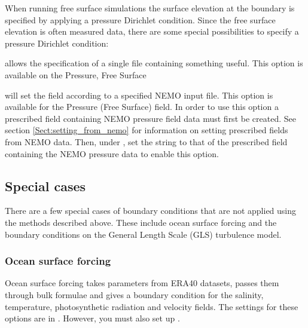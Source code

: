 When running free surface simulations the surface elevation at the boundary is specified by applying a pressure Dirichlet condition. Since the free surface elevation is often measured data, there are some special possibilities to specify a pressure Dirichlet condition: 

 allows the specification of a single file
containing something useful. This option is available on the Pressure, Free
Surface

 will set the field according to a specified NEMO
input file. This option is available for the Pressure (Free Surface) field.
In order to use this option a prescribed field containing NEMO pressure
field data must first be created. See section \ref{Sect:setting_from_nemo}
for information on setting prescribed fields from NEMO data. Then, under
, set the string to that of the prescribed
field containing the NEMO pressure data to enable this option.


\subsection{Special cases}\label{Sect:BCs:special}

There are a few special cases of boundary conditions that are not applied
using the methods described above.  These include ocean surface forcing and
the boundary conditions on the General Length Scale (GLS) turbulence model.

\subsubsection{Ocean surface forcing}\label{Sect:BCs:special:oceans}

Ocean surface forcing takes parameters from ERA40 datasets, passes them
through bulk formulae and gives a boundary condition for the salinity,
temperature, photosynthetic radiation and velocity fields. The settings for
these options are in . However, you must also set up
.

